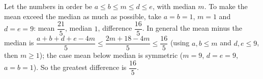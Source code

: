 Let the numbers in order be $a\le b\le m\le d\le e$, with median $m$. To make the mean exceed the median as much as possible, take $a=b=1$, $m=1$ and $d=e=9$: mean $\dfrac{21}{5}$, median $1$, difference $\dfrac{16}{5}$. In general the mean minus the median is $\dfrac{a+b+d+e-4m}{5}\le\dfrac{2m+18-4m}{5}\le\dfrac{16}{5}$ (using $a,b\le m$ and $d,e\le9$, then $m\ge1$); the case mean below median is symmetric ($m=9$, $d=e=9$, $a=b=1$). So the greatest difference is $\boxed{\dfrac{16}{5}}$.
